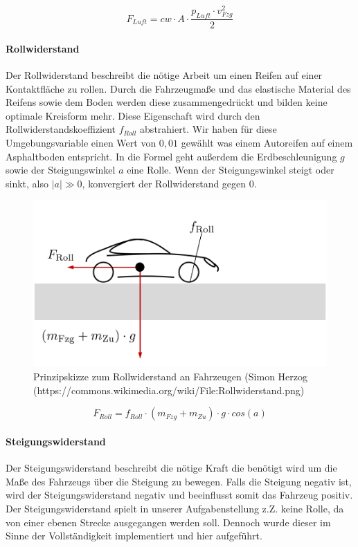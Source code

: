\documentclass[12pt,a4paper,bibliography=totocnumbered,listof=totocnumbered, abstracton]{scrartcl}
\theoremstyle{Umgebung}
\begin{document}
\begin{equation}
F_{Luft} = cw \cdot A \cdot \frac{p_{Luft} \cdot v_{Fzg}^2}{2}
\end{equation}

\paragraph{Rollwiderstand}

Der Rollwiderstand beschreibt die nötige Arbeit um einen Reifen auf einer Kontaktfläche zu rollen. Durch die Fahrzeugmaße und das elastische Material des Reifens sowie dem Boden werden diese zusammengedrückt und bilden keine optimale Kreisform mehr. Diese Eigenschaft wird durch den Rollwiderstandskoeffizient $f_{Roll}$ abstrahiert. Wir haben für diese Umgebungsvariable einen Wert von $0,01$ gewählt was einem Autoreifen auf einem Asphaltboden entspricht. In die Formel geht außerdem die Erdbeschleunigung $g$ sowie der Steigungswinkel  $a$ eine Rolle. Wenn der Steigungswinkel steigt oder sinkt, also $ |a|  \gg 0$, konvergiert der Rollwiderstand gegen $0$. 

\begin{figure}
	\centering
	\includegraphics[width=0.7\linewidth]{img/practical/Rollwiderstand}
	\caption{Prinzipskizze zum Rollwiderstand an Fahrzeugen (Simon Herzog (https://commons.wikimedia.org/wiki/File:Rollwiderstand.png)}
	\label{fig:Rollwiderstand}
\end{figure}

\begin{equation}
F_{Roll} = f_{Roll} \cdot (m_{Fzg} + m_{Zu}) \cdot g \cdot cos(a)
\end{equation}


\paragraph{Steigungswiderstand}

Der Steigungswiderstand beschreibt die nötige Kraft die benötigt wird um die Maße des Fahrzeugs über die Steigung zu bewegen. Falls die Steigung negativ ist, wird der Steigungswiderstand negativ und beeinflusst somit das Fahrzeug positiv. Der Steigungswiderstand spielt in unserer Aufgabenstellung z.Z. keine Rolle, da von einer ebenen Strecke ausgegangen werden soll. Dennoch wurde dieser im Sinne der Vollständigkeit implementiert und hier aufgeführt.
\end{document}
